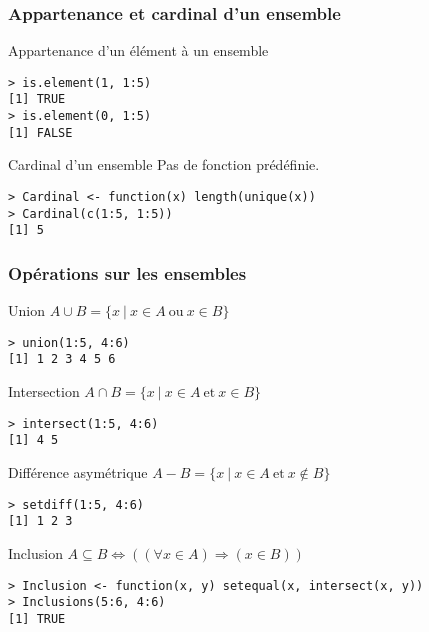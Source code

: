 \documentclass[10pt]{beamer}
\begin{document}
\begin{frame}[fragile]
  \frametitle{Appartenance et cardinal d'un ensemble}

  \begin{block}{Appartenance d'un élément à un ensemble}
    \begin{lstlisting}[style=block]
> is.element(1, 1:5)
[1] TRUE
> is.element(0, 1:5)
[1] FALSE
\end{lstlisting}
  \end{block}

  \begin{exampleblock}{Cardinal d'un ensemble}
    Pas de fonction prédéfinie.
    \begin{lstlisting}[style=block]
> Cardinal <- function(x) length(unique(x))
> Cardinal(c(1:5, 1:5))
[1] 5
\end{lstlisting}
\end{exampleblock}

\end{frame}


\begin{frame}[fragile]
  \frametitle{Opérations sur les ensembles}
  \begin{block}{Union $A \cup B = \{x\ |\ x \in A\ \mathrm{ou}\ x \in B\}$}
    \begin{lstlisting}[aboveskip = \bigskipamount]
> union(1:5, 4:6)
[1] 1 2 3 4 5 6      
    \end{lstlisting}
  \end{block}

    \begin{block}{Intersection $A \cap B = \{x\ |\ x \in A\ \mathrm{et}\ x \in B\}$}
    \begin{lstlisting}[aboveskip = \bigskipamount]
> intersect(1:5, 4:6)
[1] 4 5
    \end{lstlisting}
  \end{block}

  \begin{block}{Différence asymétrique $A - B = \{x\ |\ x \in A\ \mathrm{et}\ x \notin B\}$}
    \begin{lstlisting}[aboveskip = \bigskipamount]
> setdiff(1:5, 4:6)
[1] 1 2 3
    \end{lstlisting}
  \end{block}

  \begin{exampleblock}{Inclusion $A \subseteq B \Leftrightarrow \left((\forall x \in A) \Rightarrow (x \in B)\right)$}
    \begin{lstlisting}[aboveskip = \bigskipamount]
> Inclusion <- function(x, y) setequal(x, intersect(x, y))
> Inclusions(5:6, 4:6)
[1] TRUE
    \end{lstlisting}
  \end{exampleblock}
  

\end{frame}
\end{document}
